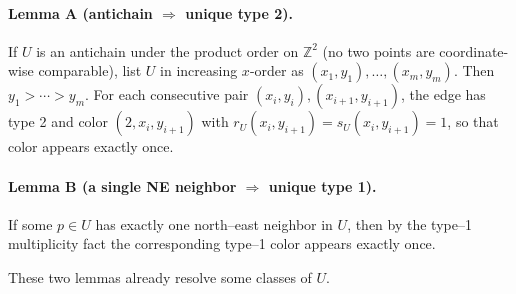 \paragraph{Lemma A (antichain $\Rightarrow$ unique type 2).}
If $U$ is an antichain under the product order on $\mathbb{Z}^2$ (no two points are coordinate-wise comparable), list $U$ in increasing $x$-order as $(x_1,y_1),\dots,(x_m,y_m)$. Then $y_1>\cdots>y_m$. For each consecutive pair $(x_i,y_i),(x_{i+1},y_{i+1})$, the edge has type 2 and color $(2,x_i,y_{i+1})$ with $r_U(x_i,y_{i+1})=s_U(x_i,y_{i+1})=1$, so that color appears exactly once.

\paragraph{Lemma B (a single NE neighbor $\Rightarrow$ unique type 1).}
If some $p\in U$ has exactly one north--east neighbor in $U$, then by the type--1 multiplicity fact the corresponding type--1 color appears exactly once.

These two lemmas already resolve some classes of $U$.
